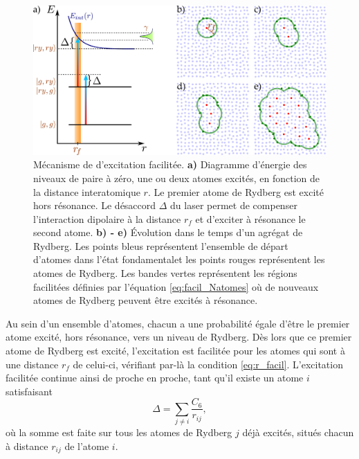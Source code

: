 \begin{figure}[!h]
\centering
\includegraphics[height=.3\textheight]{figures/low_l/dip_facil}
\caption[Mécanisme de d'excitation facilitée]{
Mécanisme de d'excitation facilitée.
\textbf{a)} Diagramme d'énergie des niveaux de paire à zéro, une ou deux atomes excités, en fonction de la distance interatomique $r$.
Le premier atome de Rydberg est excité hors résonance.
Le désaccord $\Delta$ du laser permet de compenser l'interaction dipolaire à la distance $r_f$ et d'exciter à résonance le second atome.
\textbf{b) - e)} Évolution dans le temps d'un agrégat de Rydberg.
Les points bleus représentent l'ensemble de départ d'atomes dans l'état fondamentalet les points rouges représentent les atomes de Rydberg.
Les bandes vertes représentent les régions \og facilitées \fg{} définies par l'équation \eqref{eq:facil_Natomes} où de nouveaux atomes de Rydberg peuvent être excités à résonance.
}
\label{fig:dip_facil}
\end{figure}

Au sein d'un ensemble d'atomes, chacun a une probabilité égale d'être le premier atome excité, hors résonance, vers un niveau de Rydberg.
Dès lors que ce premier atome de Rydberg est excité, l'excitation est facilitée pour les atomes qui sont à une distance $r_f$ de celui-ci, vérifiant par-là la condition \eqref{eq:r_facil}.
L'excitation facilitée continue ainsi de proche en proche, tant qu'il existe un atome $i$ satisfaisant
\begin{equation}
\label{eq:facil_Natomes}
\Delta = \sum_{j\neq i} {\frac{C_6}{r_{ij}}},
\end{equation}
où la somme est faite sur tous les atomes de Rydberg $j$ déjà excités, situés chacun à distance $r_{ij}$ de l'atome $i$.

